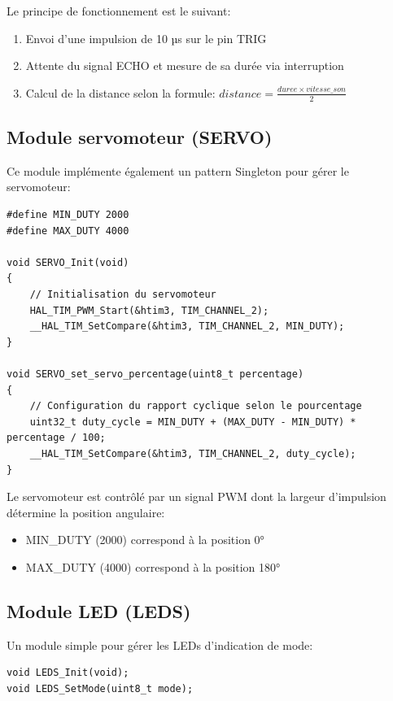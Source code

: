 \documentclass{article}
\begin{document}
Le principe de fonctionnement est le suivant:
\begin{enumerate}
    \item Envoi d'une impulsion de 10 µs sur le pin TRIG
    \item Attente du signal ECHO et mesure de sa durée via interruption
    \item Calcul de la distance selon la formule: $distance = \frac{duree \times vitesse\_son}{2}$
\end{enumerate}

\subsection{Module servomoteur (SERVO)}
Ce module implémente également un pattern Singleton pour gérer le servomoteur:

\begin{lstlisting}[caption={Module servomoteur}, label={lst:servomodule}]
#define MIN_DUTY 2000
#define MAX_DUTY 4000

void SERVO_Init(void)
{
    // Initialisation du servomoteur
    HAL_TIM_PWM_Start(&htim3, TIM_CHANNEL_2);
    __HAL_TIM_SetCompare(&htim3, TIM_CHANNEL_2, MIN_DUTY);
}

void SERVO_set_servo_percentage(uint8_t percentage)
{
    // Configuration du rapport cyclique selon le pourcentage
    uint32_t duty_cycle = MIN_DUTY + (MAX_DUTY - MIN_DUTY) * percentage / 100;
    __HAL_TIM_SetCompare(&htim3, TIM_CHANNEL_2, duty_cycle);
}
\end{lstlisting}

Le servomoteur est contrôlé par un signal PWM dont la largeur d'impulsion détermine la position angulaire:
\begin{itemize}
    \item MIN\_DUTY (2000) correspond à la position 0°
    \item MAX\_DUTY (4000) correspond à la position 180°
\end{itemize}

\subsection{Module LED (LEDS)}
Un module simple pour gérer les LEDs d'indication de mode:

\begin{lstlisting}[caption={Interface du module LED}, label={lst:ledmodule}]
void LEDS_Init(void);
void LEDS_SetMode(uint8_t mode);
\end{lstlisting}
\end{document}
